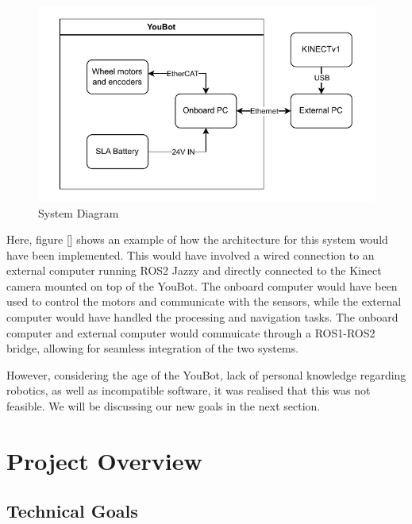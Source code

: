 \documentclass[a4paper, 12pt]{article}
\newif\ifshowadi
\newcommand{\adi}[1]{\ifshowadi\textcolor{red}{#1}\fi}
\begin{document}
    \adi{I'm not sure how the ROS stack would look like, or if its necessary to explain. Discuss with advisor}
    \begin{figure}[ht]
        \centering
        \includegraphics[width=\linewidth]{diagrams/sample.pdf}
        \caption{System Diagram}
        \label{fig:system-diagram}
    \end{figure}


    Here, figure [] shows an example of how the architecture for this system would have been implemented. This would have involved a wired connection to an external computer running ROS2 Jazzy and directly connected to the Kinect camera mounted on top of the YouBot. The onboard computer would have been used to control the motors and communicate with the sensors, while the external computer would have handled the processing and navigation tasks. The onboard computer and external computer would commuicate through a ROS1-ROS2 bridge, allowing for seamless integration of the two systems. 

    However, considering the age of the YouBot, lack of personal knowledge regarding robotics, as well as incompatible software, it was realised that this was not feasible. We will be discussing our new goals in the next section. 

    \pagebreak
    
    \section{Project Overview}

    \subsection{Technical Goals}
\end{document}
